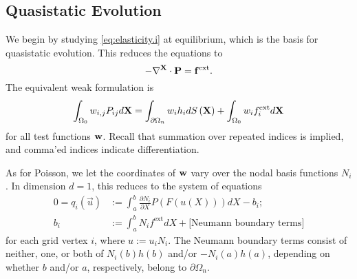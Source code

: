 \subsection{Quasistatic Evolution}

We begin by studying \eqref{eq:elasticity.i} at equilibrium, which is the basis for quasistatic evolution. This reduces the equations to
\begin{equation}\label{eq:elasticity.quasistatic}
-\nabla^{\mathbf{X}} \cdot \mathbf{P} = \mathbf{f}^{\text{ext}}.
\end{equation}
The equivalent weak formulation is
\begin{equation*}
\int_{\Omega_0} w_{i,j} P_{ij} d\mathbf{X} = \int_{\partial \Omega_n} w_i h_i dS \left( \mathbf{X} \right) + \int_{\Omega_0} w_i f_i^{\text{ext}} d\mathbf{X}
\end{equation*}
for all test functions $\mathbf{w}$. Recall that summation over repeated indices is implied, and comma'ed indices indicate differentiation.

As for Poisson, we let the coordinates of $\mathbf{w}$ vary over the nodal basis functions $N_i$. In dimension $d = 1$, this reduces to the system of equations
\begin{subequations}\label{eq:elasticity.quasistatic.weak.1d}
\begin{align}
0 = q_i \left( \vec{u} \right) & := \int_a^b \frac{\partial N_i}{\partial X} P(F(u(X))) dX - b_i; \label{eq:elasticity.quasistatic.weak.1d.qi} \\
b_i & := \int_a^b N_i f^{\text{ext}} dX + \text{[Neumann boundary terms]} \label{eq:elasticity.quasistatic.weak.1d.bi}
\end{align}
\end{subequations}
for each grid vertex $i$, where $u := u_i N_i$. The Neumann boundary terms consist of neither, one, or both of $N_i(b) h(b)$ and/or $-N_i(a) h(a)$, depending on whether $b$ and/or $a$, respectively, belong to $\partial\Omega_n$.

